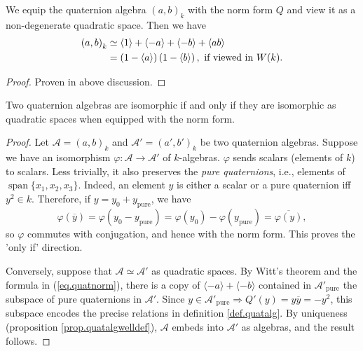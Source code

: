 \documentclass{article}
\newcommand{\qa}[2]{\left(#1\right)_{#2}}
\begin{document}
\begin{lemma}
    We equip the quaternion algebra $\qa{a,b}{k}$ with the norm form $Q$ and view it as a non-degenerate quadratic space. Then we have
    \begin{align}\label{eq.quatnorm}
        \qa{a,b}{k} &\simeq \langle 1\rangle+\langle -a\rangle+\langle -b\rangle+\langle ab\rangle \\
        &= \left(1-\langle a\rangle\right)\left(1-\langle b\rangle\right),
        \ \text{if viewed in }W(k). \notag
    \end{align}
\end{lemma}

\begin{proof}
    Proven in above discussion.
\end{proof}

\begin{lemma}\label{lem.quatalgisom}
    Two quaternion algebras are isomorphic if and only if they are isomorphic as quadratic spaces when equipped with the norm form.
\end{lemma}

\begin{proof}
    Let $\mathcal{A}=\qa{a,b}{k}$ and $\mathcal{A}'=\qa{a',b'}{k}$ be two quaternion algebras. Suppose we have an isomorphism $\varphi:\mathcal{A}\to\mathcal{A}'$ of $k$-algebras. $\varphi$ sends scalars (elements of $k$) to scalars. Less trivially, it also preserves the \emph{pure quaternions}, i.e., elements of $\operatorname{span}\{x_1,x_2,x_3\}$. Indeed, an element $y$ is either a scalar or a pure quaternion iff $y^2\in k$. Therefore, if $y=y_0+y_{\text{pure}}$, we have
    \begin{equation*}
        \varphi(\overline{y})=\varphi(y_0-y_{\text{pure}})=\varphi(y_0)-\varphi(y_{\text{pure}})=\overline{\varphi(y)},
    \end{equation*}
    so $\varphi$ commutes with conjugation, and hence with the norm form. This proves the 'only if' direction.

    Conversely, suppose that $\mathcal{A}\simeq\mathcal{A}'$ as quadratic spaces. By Witt's theorem and the formula in (\ref{eq.quatnorm}), there is a copy of $\langle -a\rangle+\langle -b\rangle$ contained in $\mathcal{A}'_{\text{pure}}$ the subspace of pure quaternions in $\mathcal{A}'$. Since $y\in\mathcal{A}'_{\text{pure}}\Longrightarrow Q'(y)=y\overline{y}=-y^2$, this subspace encodes the precise relations in definition \ref{def.quatalg}. By uniqueness (proposition \ref{prop.quatalgwelldef}), $\mathcal{A}$ embeds into $\mathcal{A}'$ as algebras, and the result follows.
\end{proof}
\end{document}
